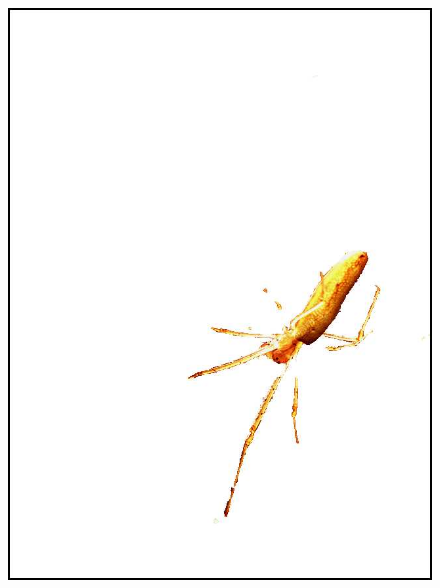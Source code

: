\begin{figure}
{\includegraphics[scale=0.15]{figures/chapter2/grabcut-connectivity/cp-2.png}
}
\subfloat[]{
}
\end{figure}
